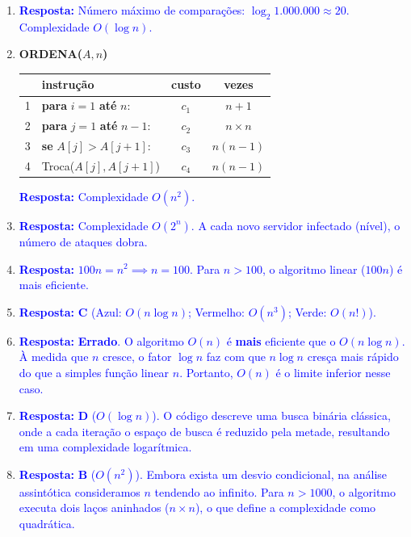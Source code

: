 \documentclass[12pt]{article}
\newcommand{\resposta}[1]{\textcolor{blue}{\textbf{Resposta:} #1}}
\begin{document}
\begin{enumerate}[label=\arabic*), leftmargin=1.5cm, itemsep=1cm]
    \item \resposta{Número máximo de comparações: $\log_2 1.000 .000 \approx 20$. Complexidade $O(\log n)$.}

    \item \textbf{ORDENA($A, n$)} \\
    \begin{tcolorbox}[colback=white, colframe=black, fontupper=\small]
        \begin{tabular}{llcc}
            \hline
            & \textbf{instrução} & \textbf{custo} & \textbf{vezes} \\
            \hline
            1 & \textbf{para} $i = 1$ \textbf{até} $n$: & $c_1$ & $n+1$ \\
            2 & \quad \textbf{para} $j = 1$ \textbf{até} $n - 1$: & $c_2$ & $n \times n$ \\
            3 & \quad \quad \textbf{se} $A[j] > A[j+1]$: & $c_3$ & $n(n-1)$ \\
            4 & \quad \quad \quad Troca($A[j], A[j+1]$) & $c_4$ & $n(n-1)$ \\
            \hline
        \end{tabular}
    \end{tcolorbox}
    \resposta{Complexidade $O(n^2)$.}

    \item \resposta{Complexidade $O(2^n)$. A cada novo servidor infectado (nível), o número de ataques dobra.}

    \item \resposta{$100n = n^2 \implies n = 100$. Para $n > 100$, o algoritmo linear ($100n$) é mais eficiente.}

    \item \resposta{\textbf{C} (Azul: $O(n \log n)$; Vermelho: $O(n^3)$; Verde: $O(n!)$).}

    \item \resposta{\textbf{Errado}. O algoritmo $O(n)$ é \textbf{mais} eficiente que o $O(n \log n)$. À medida que $n$ cresce, o fator $\log n$ faz com que $n \log n$ cresça mais rápido do que a simples função linear $n$. Portanto, $O(n)$ é o limite inferior nesse caso.}

    \item \resposta{\textbf{D} ($O(\log n)$). O código descreve uma busca binária clássica, onde a cada iteração o espaço de busca é reduzido pela metade, resultando em uma complexidade logarítmica.}

    \item \resposta{\textbf{B} ($O(n^2)$). Embora exista um desvio condicional, na análise assintótica consideramos $n$ tendendo ao infinito. Para $n > 1000$, o algoritmo executa dois laços aninhados ($n \times n$), o que define a complexidade como quadrática.}

\end{enumerate}
\end{document}
